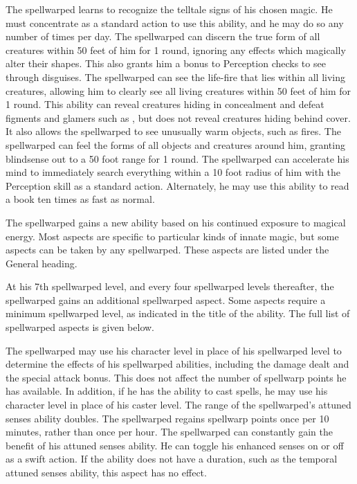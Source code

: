  The spellwarped learns to recognize the telltale signs of his chosen magic. He must concentrate as a standard action to use this ability, and he may do so any number of times per day.
 The spellwarped can discern the true form of all creatures within 50 feet of him for 1 round, ignoring any effects which magically alter their shapes. This also grants him a  bonus to Perception checks to see through disguises.
 The spellwarped can see the life-fire that lies within all living creatures, allowing him to clearly see all living creatures within 50 feet of him for 1 round. This ability can reveal creatures hiding in concealment and defeat figments and glamers such as , but does not reveal creatures hiding behind cover. It also allows the spellwarped to see unusually warm objects, such as fires.
 The spellwarped can feel the forms of all objects and creatures around him, granting blindsense out to a 50 foot range for 1 round.
 The spellwarped can accelerate his mind to immediately search everything within a 10 foot radius of him with the Perception skill as a standard action. Alternately, he may use this ability to read a book ten times as fast as normal.

 The spellwarped gains a new ability based on his continued exposure to magical energy. Most aspects are specific to particular kinds of innate magic, but some aspects can be taken by any spellwarped. These aspects are listed under the General heading.

At his 7th spellwarped level, and every four spellwarped levels thereafter, the spellwarped gains an additional spellwarped aspect. Some aspects require a minimum spellwarped level, as indicated in the title of the ability. The full list of spellwarped aspects is given below.

 The spellwarped may use his character level in place of his spellwarped level to determine the effects of his spellwarped abilities, including the damage dealt and the special attack bonus. This does not affect the number of spellwarp points he has available. In addition, if he has the ability to cast spells, he may use his character level in place of his caster level.
 The range of the spellwarped's attuned senses ability doubles.
 The spellwarped regains spellwarp points once per 10 minutes, rather than once per hour.
 The spellwarped can constantly gain the benefit of his attuned senses ability. He can toggle his enhanced senses on or off as a swift action. If the ability does not have a duration, such as the temporal attuned senses ability, this aspect has no effect.

